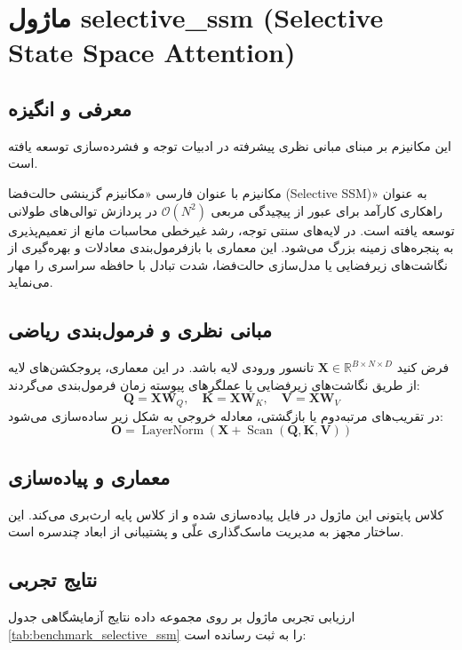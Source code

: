 \section{ماژول selective\_ssm (Selective State Space Attention)}
\label{sec:module_selective_ssm}

\subsection{معرفی و انگیزه}
این مکانیزم بر مبنای مبانی نظری پیشرفته در ادبیات توجه و فشرده‌سازی \cite{gu2023mamba} توسعه یافته است.

مکانیزم  با عنوان فارسی «مکانیزم گزینشی حالت‌فضا (Selective SSM)» به عنوان راهکاری کارآمد برای عبور از پیچیدگی مربعی $\mathcal{O}(N^2)$ در پردازش توالی‌های طولانی توسعه یافته است. در لایه‌های سنتی توجه، رشد غیرخطی محاسبات مانع از تعمیم‌پذیری به پنجره‌های زمینه بزرگ می‌شود. این معماری با بازفرمول‌بندی معادلات و بهره‌گیری از نگاشت‌های زیرفضایی یا مدل‌سازی حالت‌فضا، شدت تبادل با حافظه سراسری را مهار می‌نماید.

\subsection{مبانی نظری و فرمول‌بندی ریاضی}
فرض کنید $\mathbf{X} \in \mathbb{R}^{B \times N \times D}$ تانسور ورودی لایه باشد. در این معماری، پروجکشن‌های لایه از طریق نگاشت‌های زیرفضایی یا عملگرهای پیوسته زمان فرمول‌بندی می‌گردند:
 \begin{equation}
\mathbf{Q} = \mathbf{X} \mathbf{W}_Q, \quad \mathbf{K} = \mathbf{X} \mathbf{W}_K, \quad \mathbf{V} = \mathbf{X} \mathbf{W}_V
\end{equation}
در تقریب‌های مرتبه‌دوم یا بازگشتی، معادله خروجی به شکل زیر ساده‌سازی می‌شود:
 \begin{equation}
\mathbf{O} = \operatorname{LayerNorm}\left(\mathbf{X} + \operatorname{Scan}(\mathbf{Q}, \mathbf{K}, \mathbf{V})
\right)
\end{equation}

\subsection{معماری و پیاده‌سازی}
کلاس پایتونی این ماژول در فایل  پیاده‌سازی شده و از کلاس پایه  ارث‌بری می‌کند. این ساختار مجهز به مدیریت ماسک‌گذاری علّی و پشتیبانی از ابعاد چندسره است.

\subsection{نتایج تجربی}
ارزیابی تجربی ماژول  بر روی مجموعه داده  نتایج آزمایشگاهی جدول 
\ref{tab:benchmark_selective_ssm} را به ثبت رسانده است:

